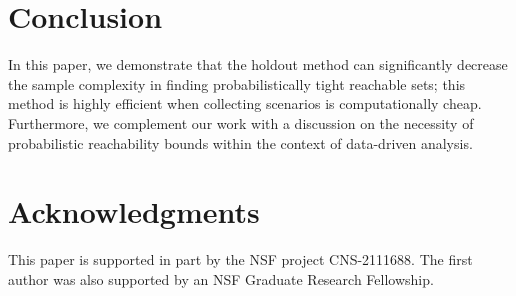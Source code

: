 \documentclass[letterpaper, 10 pt, conference]{ieeeconf}  %
\begin{document}




\section{Conclusion}
In this paper, we demonstrate that the holdout method can significantly decrease the sample complexity in finding probabilistically tight reachable sets; this method is highly efficient when collecting scenarios is computationally cheap. Furthermore, we complement our work with a discussion on the necessity of probabilistic reachability bounds within the context of data-driven analysis. 


\section{Acknowledgments}

This paper is supported in part by 
the NSF 
project CNS-2111688. The first author was also supported by an NSF Graduate Research Fellowship. 

 
\end{document}

